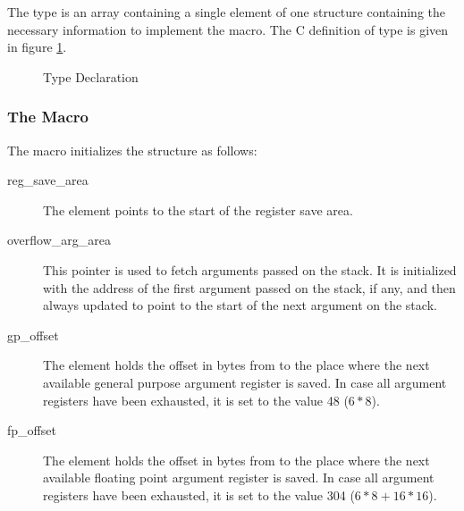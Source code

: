 The  type is an array containing a single element of one
structure
containing the necessary information to implement the  macro. The C
definition of  type is given in figure \ref{fig-va_list}.

\begin{figure}[H]
\Hrule
\caption{ Type Declaration}
\label{fig-va_list}
\begin{center}
\end{center}
\Hrule
\end{figure}


\subsubsection{The  Macro}

The  macro initializes the structure as follows:

\begin{description}
\item [reg_save_area]
The element points to the start of the register save area.
\item [overflow_arg_area] This pointer is used to fetch arguments
  passed on the stack.  It is initialized with the address of the
  first argument passed on the stack, if any, and then always updated
  to point to the start of the next argument on the stack.
\item [gp_offset] The element holds the offset in bytes from
   to the place where the next available general
  purpose argument register is saved.  In case all argument registers
  have been exhausted, it is set to the value 48 ($6*8$).
\item [fp_offset]
The element holds the offset in bytes from  to the
place where the next available floating point
argument register is saved.  In case all argument registers have been exhausted,
it is set to the value 304 ($6*8+16*16$).
\end{description}

